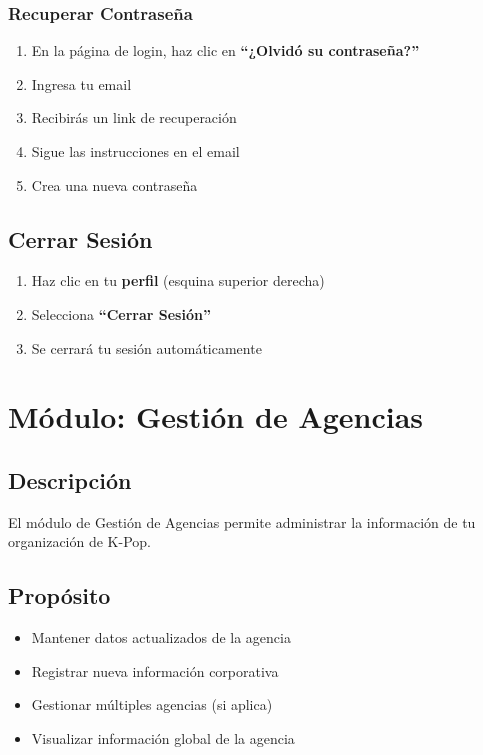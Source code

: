 \documentclass[12pt,a4paper,spanish,oneside]{report}
\begin{document}
\subsection{Recuperar Contraseña}

\begin{enumerate}
    \item En la página de login, haz clic en \textbf{``¿Olvidó su contraseña?''}
    \item Ingresa tu email
    \item Recibirás un link de recuperación
    \item Sigue las instrucciones en el email
    \item Crea una nueva contraseña
\end{enumerate}

\section{Cerrar Sesión}

\begin{enumerate}
    \item Haz clic en tu \textbf{perfil} (esquina superior derecha)
    \item Selecciona \textbf{``Cerrar Sesión''}
    \item Se cerrará tu sesión automáticamente
\end{enumerate}

\chapter{Módulo: Gestión de Agencias}

\section{Descripción}

El módulo de Gestión de Agencias permite administrar la información de tu organización de K-Pop.

\section{Propósito}

\begin{itemize}
    \item Mantener datos actualizados de la agencia
    \item Registrar nueva información corporativa
    \item Gestionar múltiples agencias (si aplica)
    \item Visualizar información global de la agencia
\end{itemize}
\end{document}
